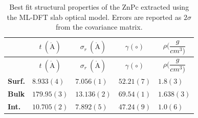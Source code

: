 \begin{longtable}[]{@{}
  >{\raggedright\arraybackslash}p{}
  >{\raggedright\arraybackslash}p{}
  >{\raggedright\arraybackslash}p{}
  >{\raggedright\arraybackslash}p{}
  >{\raggedright\arraybackslash}p{}@{}}
\caption{Best fit structural properties of the ZnPc extracted using the ML-DFT slab optical model. Errors are reported as \(2\sigma\) from the covariance matrix.}\label{tab:S2}\tabularnewline
\toprule\noalign{}
\begin{minipage}[b]{\linewidth}\raggedright
\end{minipage} & \begin{minipage}[b]{\linewidth}\raggedright
\[t\ (\mathring{\mathrm{A}})\]
\end{minipage} & \begin{minipage}[b]{\linewidth}\raggedright
\[\sigma_{r}\ (\mathring{\mathrm{A}})\]
\end{minipage} & \begin{minipage}[b]{\linewidth}\raggedright
\[\gamma( \circ )\]
\end{minipage} & \begin{minipage}[b]{\linewidth}\raggedright
\[\rho(\frac{g}{cm^{3})}\]
\end{minipage} \\
\midrule\noalign{}
\endfirsthead
\toprule\noalign{}
\begin{minipage}[b]{\linewidth}\raggedright
\end{minipage} & \begin{minipage}[b]{\linewidth}\raggedright
\[t\ (\mathring{\mathrm{A}})\]
\end{minipage} & \begin{minipage}[b]{\linewidth}\raggedright
\[\sigma_{r}\ (\mathring{\mathrm{A}})\]
\end{minipage} & \begin{minipage}[b]{\linewidth}\raggedright
\[\gamma( \circ )\]
\end{minipage} & \begin{minipage}[b]{\linewidth}\raggedright
\[\rho(\frac{g}{cm^{3})}\]
\end{minipage} \\
\midrule\noalign{}
\endhead
\bottomrule\noalign{}
\endlastfoot
\textbf{Surf.} & \(8.933(4)\) & \(7.056(1)\) & \(52.21(7)\) & \(1.8(3)\) \\
\textbf{Bulk} & \(179.95(3)\) & \(13.136(2)\) & \(69.54(1)\) & \(1.638(3)\) \\
\textbf{Int.} & \(10.705(2)\) & \(7.892(5)\) & \(47.24(9)\) & \(1.0(6)\) \\
\end{longtable}

